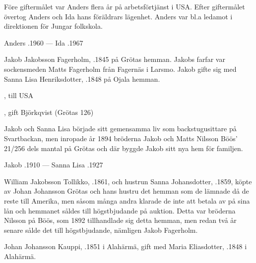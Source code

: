 Före giftermålet var Anders flera år på arbetsförtjänst i USA. Efter giftermålet övertog Anders och Ida hans föräldrars lägenhet. Anders var bl.a ledamot i direktionen för Jungar folkskola.

Anders .1960  --- Ida .1967


%
Jakob Jakobsson Fagerholm, .1845 på Grötas hemman. Jakobs farfar var sockensmeden Matts Fagerholm från Fagernäs i Larsmo. Jakob gifte sig med Sanna Lisa Henriksdotter, .1848 på Ojala hemman.
\begin{jhchildren}
  \item {}, till USA
  \item {}
  \item {}
  \item {}, gift Björkqvist (Grötas 126)
\end{jhchildren}

Jakob och Sanna Lisa började sitt gemensamma liv som backstugusittare på Svartbackan, men inropade år 1894  bröderna Jakob och Matts Nilsson Böös' 21/256 dels mantal på Grötas och där byggde Jakob sitt nya hem för familjen.

Jakob .1910  ---  Sanna Lisa .1927


%
William Jakobsson Tollikko, .1861, och hustrun Sanna Johansdotter, .1859, köpte av  Johan Johansson Grötas och hans hustru det hemman som de lämnade då de reste till Amerika, men såsom många andra klarade de inte att betala av på sina lån och hemmanet såldes till högstbjudande på auktion. Detta var bröderna Nilsson på Böös, som 1892 tillhandlade sig detta hemman, men redan två år senare sålde det till högstbjudande, nämligen Jakob Fagerholm.


%
Johan Johansson Kauppi, .1851 i Alahärmä, gift med Maria Eliasdotter, .1848 i Alahärmä.
\begin{jhchildren}
  \item {}
  \item {}
  \item {}
  \item {}
\end{jhchildren}

